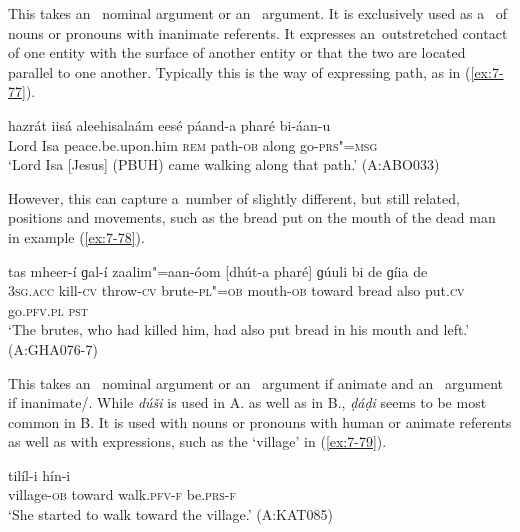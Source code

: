  This  takes an~ nominal argument or an~  argument. It is exclusively used as a~ of nouns or pronouns with inanimate referents. It expresses an~outstretched contact of one entity with the surface of another entity or that the two are located parallel to one another. Typically this is the way of expressing path, as in (\ref{ex:7-77}).

\begin{exe}
\ex
\label{ex:7-77}
\gll hazrát iisá aleehisalaám eesé páand-a pharé bi-áan-u \\
Lord Isa peace.be.upon.him \textsc{rem} path-\textsc{ob} along go-\textsc{prs"=msg} \\
\glt `Lord Isa [Jesus] (PBUH) came walking along that path.' (A:ABO033)
\end{exe}

However, this  can capture a~number of slightly different, but still related, positions and movements, such as the bread put on the mouth of the dead man in example (\ref{ex:7-78}). 

\begin{exe}
\ex
\label{ex:7-78}
\gll tas mheer-í ɡal-í zaalim"=aan-óom [dhút-a pharé] ɡúuli bi de ɡíia de \\
\textsc{3sg.acc} kill-\textsc{cv} throw-\textsc{cv} brute-\textsc{pl"=ob} mouth-\textsc{ob} toward bread also put.\textsc{cv} go.\textsc{pfv.pl} \textsc{pst} \\
\glt `The brutes, who had killed him, had also put bread in his mouth and left.' (A:GHA076-7)
\end{exe}

 This  takes an~ nominal argument or an~  argument if animate and an~ argument if inanimate/. While \textit{dúši} is used in A. as well as in B., \textit{ḍáḍi} seems to be most common in B. It is used with nouns or pronouns with human or animate referents as well as with  expressions, such as the `village' in (\ref{ex:7-79}). 

\begin{exe}
\ex
\label{ex:7-79}
 tilíl-i hín-i \\
village-\textsc{ob} toward walk.\textsc{pfv-f} be.\textsc{prs-f} \\
\glt `She started to walk toward the village.' (A:KAT085)
\end{exe}

